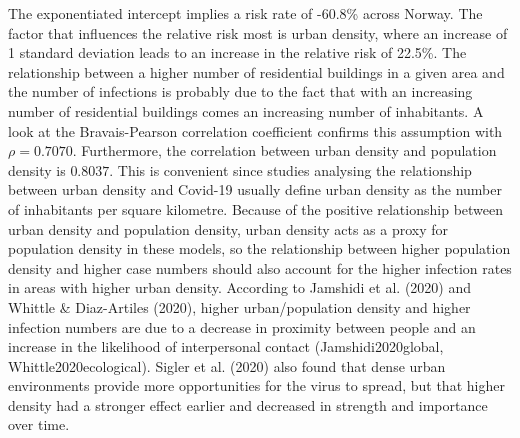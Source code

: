 The exponentiated intercept implies a risk rate of -60.8\% across Norway. The factor that influences the relative risk most is urban density, where an increase of 1 standard deviation leads to an increase in the relative risk of 22.5\%. The relationship between a higher number of residential buildings in a given area and the number of infections is probably due to the fact that with an increasing number of residential buildings comes an increasing number of inhabitants. A look at the Bravais-Pearson correlation coefficient confirms this assumption with $\rho=0.7070$. Furthermore, the correlation between urban density and population density is $0.8037$. This is convenient since studies analysing the relationship between urban density and Covid-19 usually define urban density as the number of inhabitants per square kilometre. Because of the positive relationship between urban density and population density, urban density acts as a proxy for population density in these models, so the relationship between higher population density and higher case numbers should also account for the higher infection rates in areas with higher urban density. According to Jamshidi et al. (2020) and Whittle \& Diaz-Artiles (2020), higher urban/population density and higher infection numbers are due to a decrease in proximity between people and an increase in the likelihood of interpersonal contact (Jamshidi2020global, Whittle2020ecological). Sigler et al. (2020) also found that dense urban environments provide more opportunities for the virus to spread, but that higher density had a stronger effect earlier and decreased in strength and importance over time\autocite[][]{sigler2020socio}. \\
